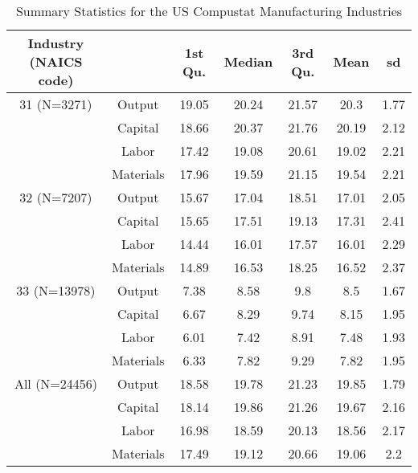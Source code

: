 \begin{table}[H]
\centering
\caption{Summary Statistics for the US Compustat Manufacturing Industries} 
\begin{tabular}{ccccccc}
  \hline\hline Industry (NAICS code) &   & 1st Qu. & Median & 3rd Qu. & Mean & sd \\ 
  \hline
31 (N=3271) & Output & 19.05 & 20.24 & 21.57 & 20.3 & 1.77 \\ 
   & Capital & 18.66 & 20.37 & 21.76 & 20.19 & 2.12 \\ 
   & Labor & 17.42 & 19.08 & 20.61 & 19.02 & 2.21 \\ 
   & Materials & 17.96 & 19.59 & 21.15 & 19.54 & 2.21 \\ 
  32 (N=7207) & Output & 15.67 & 17.04 & 18.51 & 17.01 & 2.05 \\ 
   & Capital & 15.65 & 17.51 & 19.13 & 17.31 & 2.41 \\ 
   & Labor & 14.44 & 16.01 & 17.57 & 16.01 & 2.29 \\ 
   & Materials & 14.89 & 16.53 & 18.25 & 16.52 & 2.37 \\ 
  33 (N=13978) & Output & 7.38 & 8.58 & 9.8 & 8.5 & 1.67 \\ 
   & Capital & 6.67 & 8.29 & 9.74 & 8.15 & 1.95 \\ 
   & Labor & 6.01 & 7.42 & 8.91 & 7.48 & 1.93 \\ 
   & Materials & 6.33 & 7.82 & 9.29 & 7.82 & 1.95 \\ 
  All (N=24456) & Output & 18.58 & 19.78 & 21.23 & 19.85 & 1.79 \\ 
   & Capital & 18.14 & 19.86 & 21.26 & 19.67 & 2.16 \\ 
   & Labor & 16.98 & 18.59 & 20.13 & 18.56 & 2.17 \\ 
   & Materials & 17.49 & 19.12 & 20.66 & 19.06 & 2.2 \\ 
   \hline
\end{tabular}
\end{table}
